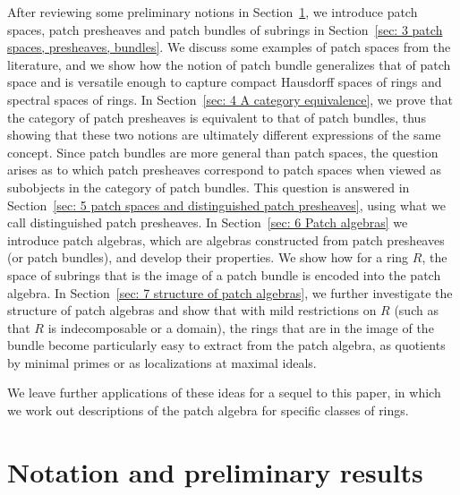\documentclass[11pt]{amsart}
\theoremstyle{definition}
\begin{document}
After reviewing some preliminary notions in Section~\ref{sec: 2 notation and preliminary results}, we introduce patch spaces, patch presheaves and patch bundles of subrings   in Section~\ref{sec: 3 patch spaces, presheaves, bundles}. We discuss some examples of patch spaces from the literature, and we show how the notion of patch bundle generalizes that of patch space and is versatile enough to capture compact Hausdorff spaces of rings and spectral spaces of rings. 
In Section~\ref{sec: 4 A category equivalence}, we prove that the category of patch presheaves is equivalent to that of patch bundles, thus showing that these two notions are ultimately different expressions of the same concept. Since patch bundles are more general than patch spaces, the question arises as to which patch presheaves correspond to patch spaces when viewed as subobjects in the category of patch bundles. This question is answered in Section~\ref{sec: 5 patch spaces and distinguished patch presheaves}, using what we call distinguished patch presheaves.
In Section~\ref{sec: 6 Patch algebras} we introduce patch algebras, which are algebras constructed from patch presheaves (or patch bundles), and develop their properties. We show how for a ring $R$, the space of subrings that is the image of a patch bundle is encoded into the patch algebra. In Section~\ref{sec: 7 structure of patch algebras}, we further investigate the structure of patch algebras and show that with mild restrictions on $R$ (such as that $R$ is indecomposable or a domain), the rings that are in the image of the bundle become particularly easy to extract from the patch algebra, as quotients by minimal primes or as localizations at maximal ideals. 

We leave further applications of these ideas for a sequel to this paper, in which we work out descriptions of the patch algebra for specific classes of rings.  

\section{Notation and preliminary results}\label{sec: 2 notation and preliminary results}
\end{document}
